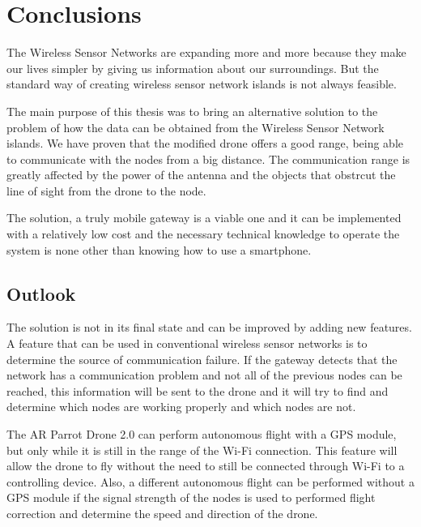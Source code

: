 \chapter{Conclusions}


The Wireless Sensor Networks are expanding more and more because they make our lives simpler by giving us information about our surroundings. But the standard way of creating wireless sensor network islands is not always feasible.

The main purpose of this thesis was to bring an alternative solution to the problem of how the data can be obtained from the Wireless Sensor Network islands. We have proven that the modified drone offers a good range, being able to communicate with the nodes from a big distance. The communication range is greatly affected by the power of the antenna and the objects that obstrcut the line of sight from the drone to the node.


The solution, a truly mobile gateway is a viable one and it can be implemented with a relatively low cost and the necessary technical knowledge to operate the system is none other than knowing how to use a smartphone.




\section{Outlook}

The solution is not in its final state and can be improved by adding new features. A feature that can be used in conventional wireless sensor networks is to determine the source of communication failure. If the gateway detects that the network has a communication problem and not all of the previous nodes can be reached, this information will be sent to the drone and it will try to find and determine which nodes are working properly and which nodes are not.

The AR Parrot Drone 2.0 can perform autonomous flight with a GPS module, but only while it is still in the range of the Wi-Fi connection. This feature will allow the drone to fly without the need to still be connected through Wi-Fi to a controlling device. Also, a different autonomous flight can be performed without a GPS module if the signal strength of the nodes is used to performed flight correction and determine the speed and direction of the drone.

